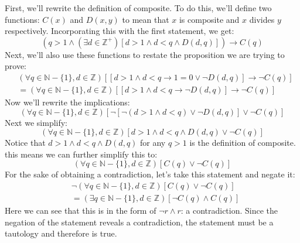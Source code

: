 \documentclass[12pt, letter]{article}
\begin{document}
\begin{enumerate}
		\noindent{}
		\begin{center}
			First, we'll rewrite the definition of composite. To do this, we'll define two functions: $C(x)$ and $D(x, y)$ to mean that $x$ is composite and $x$ divides $y$ respectively. Incorporating this with the first statement, we get:
			$$(q > 1\wedge (\exists d \in \mathbb{Z}^{+})[d > 1 \wedge d < q \wedge D(d, q)]) \to C(q)$$
			Next, we'll also use these functions to restate the proposition we are trying to prove:
			\begin{align*}
				&(\forall q \in \mathbb{N} - \{1\}, d \in \mathbb{Z})[[d > 1 \wedge d < q \to 1 = 0 \vee \neg D(d, q)] \to \neg C(q)] \\
				&= (\forall q \in \mathbb{N} - \{1\}, d \in \mathbb{Z})[[d > 1 \wedge d < q \to \neg D(d, q)] \to \neg C(q)]
			\end{align*}
			Now we'll rewrite the implications:
			$$(\forall q \in \mathbb{N} - \{1\}, d \in \mathbb{Z})[\neg [\neg (d > 1 \wedge d < q) \vee \neg D(d, q)] \vee \neg C(q)]$$
			Next we simplify:
			$$(\forall q \in \mathbb{N} - \{1\}, d \in \mathbb{Z})[d > 1 \wedge d < q \wedge D(d, q) \vee \neg C(q)]$$
			Notice that $d > 1 \wedge d < q \wedge D(d, q)$ for any $q > 1$ is the definition of composite. this means we can further simplify this to:
			$$(\forall q \in \mathbb{N} - \{1\}, d \in \mathbb{Z})[C(q) \vee \neg C(q)]$$
			For the sake of obtaining a contradiction, let's take this statement and negate it:
			\begin{align*}
				&\neg (\forall q \in \mathbb{N} - \{1\}, d \in \mathbb{Z})[C(q) \vee \neg C(q)] \\
				&= (\exists q \in \mathbb{N} - \{1\}, d \in \mathbb{Z})[\neg C(q) \wedge C(q)]
			\end{align*}
			Here we can see that this is in the form of $\neg r \wedge r$: a contradiction. Since the negation of the statement reveals a contradiction, the statement must be a tautology and therefore is true.
		\end{center}
	\end{enumerate}
\end{document}
